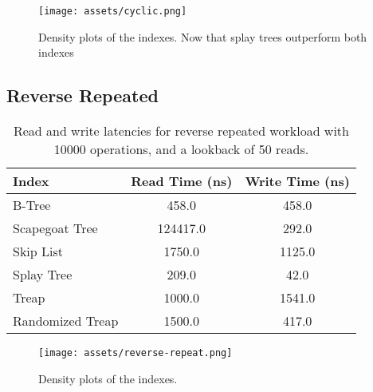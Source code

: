 \documentclass[sigconf]{acmart}
\begin{document}
\begin{center}
  \begin{figure}[H]
    \texttt{[image: assets/cyclic.png]}
    \caption{Density plots of the indexes. Now that splay trees outperform both indexes}
  \end{figure}
\end{center}


\subsection{Reverse Repeated}
\begin{center}
  \begin{table}[H]
    \begin{tabular}{|l|c|c|}
      \hline
      \bf{Index} & \bf{Read Time (ns)} & \bf{Write Time (ns)} \\
      \hline
      B-Tree&458.0&458.0\\
      \hline
      Scapegoat Tree&124417.0&292.0\\
      \hline
      Skip List&1750.0&1125.0\\
      \hline
      Splay Tree&209.0&42.0\\
      \hline
      Treap&1000.0&1541.0\\
      \hline
      Randomized Treap&1500.0&417.0\\
      \hline
    \end{tabular}
    \caption{Read and write latencies for reverse repeated workload with 10000 operations, and a lookback of 50 reads.}
  \end{table}
\end{center}



\begin{center}
  \begin{figure}[H]
    \texttt{[image: assets/reverse-repeat.png]}
    \caption{Density plots of the indexes.}
  \end{figure}
\end{center}
\newpage
\end{document}
